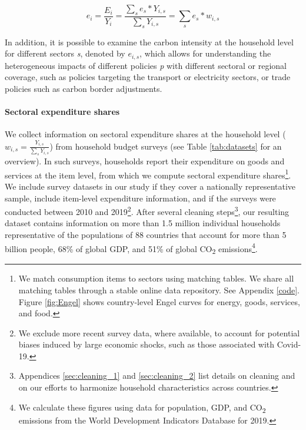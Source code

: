\documentclass[12pt, a4paper]{article}
\begin{document}

\begin{equation} \label{eq:ei}
e_{i} = \frac{E_{i}}{Y_{i}} = \frac{\sum_{s} e_{s}*Y_{i,s}}{\sum_{s} Y_{i,s}} = \sum_{s} e_{s}*w_{i,s}
\end{equation}


In addition, it is possible to examine the carbon intensity at the household level for different sectors \textit{s}, denoted by $e_{i,s}$, which allows for understanding the heterogeneous impacts of different policies \textit{p} with different sectoral or regional coverage, such as policies targeting the transport or electricity sectors, or trade policies such as carbon border adjustments.

\paragraph{Sectoral expenditure shares} We collect information on sectoral expenditure shares at the household level ($w_{i,s}=\frac{Y_{i,s}}{\sum_{s}Y_{i,s}}$) from household budget surveys (see Table \ref{tab:datasets} for an overview). In such surveys, households report their expenditure on goods and services at the item level, from which we compute sectoral expenditure shares\footnote{We match consumption items to sectors using matching tables. We share all matching tables through a stable online data repository. See Appendix \ref{code}. Figure \ref{fig:Engel} shows country-level Engel curves for energy, goods, services, and food.}. We include survey datasets in our study if they cover a nationally representative sample, include item-level expenditure information, and if the surveys were conducted between 2010 and 2019\footnote{We exclude more recent survey data, where available, to account for potential biases induced by large economic shocks, such as those associated with Covid-19.}. After several cleaning steps\footnote{Appendices \ref{sec:cleaning_1} and \ref{sec:cleaning_2} list details on cleaning and on our efforts to harmonize household characteristics across countries.}, our resulting dataset contains information on more than 1.5 million individual households representative of the populations of 88 countries that account for more than 5 billion people, 68\% of global GDP, and 51\% of global CO\textsubscript{2} emissions\footnote{We calculate these figures using data for population, GDP, and CO\textsubscript{2} emissions from the World Development Indicators Database \autocite{WorldBankGroup.2023} for 2019.}.
\end{document}
